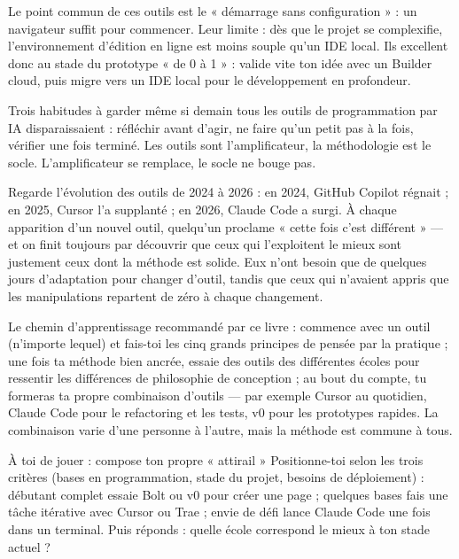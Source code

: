 Le point commun de ces outils est le « démarrage sans configuration » : un navigateur suffit pour commencer. Leur limite : dès que le projet se complexifie, l'environnement d'édition en ligne est moins souple qu'un IDE local. Ils excellent donc au stade du prototype « de 0 à 1 » : valide vite ton idée avec un Builder cloud, puis migre vers un IDE local pour le développement en profondeur.


Trois habitudes à garder même si demain tous les outils de programmation par IA disparaissaient : réfléchir avant d'agir, ne faire qu'un petit pas à la fois, vérifier une fois terminé. Les outils sont l'amplificateur, la méthodologie est le socle. L'amplificateur se remplace, le socle ne bouge pas.

Regarde l'évolution des outils de 2024 à 2026 : en 2024, GitHub Copilot régnait ; en 2025, Cursor l'a supplanté ; en 2026, Claude Code a surgi. À chaque apparition d'un nouvel outil, quelqu'un proclame « cette fois c'est différent » — et on finit toujours par découvrir que ceux qui l'exploitent le mieux sont justement ceux dont la méthode est solide. Eux n'ont besoin que de quelques jours d'adaptation pour changer d'outil, tandis que ceux qui n'avaient appris que les manipulations repartent de zéro à chaque changement.

Le chemin d'apprentissage recommandé par ce livre : commence avec un outil (n'importe lequel) et fais-toi les cinq grands principes de pensée par la pratique ; une fois ta méthode bien ancrée, essaie des outils des différentes écoles pour ressentir les différences de philosophie de conception ; au bout du compte, tu formeras ta propre combinaison d'outils — par exemple Cursor au quotidien, Claude Code pour le refactoring et les tests, v0 pour les prototypes rapides. La combinaison varie d'une personne à l'autre, mais la méthode est commune à tous.

\begin{tcbpractice}{À toi de jouer : compose ton propre « attirail »}
Positionne-toi selon les trois critères (bases en programmation, stade du projet, besoins de déploiement) : débutant complet essaie Bolt ou v0 pour créer une page ; quelques bases fais une tâche itérative avec Cursor ou Trae ; envie de défi lance Claude Code une fois dans un terminal. Puis réponds : quelle école correspond le mieux à ton stade actuel ?

\end{tcbpractice}

